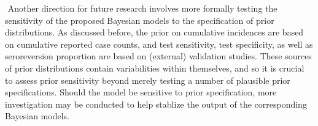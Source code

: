 \newline$ $
Another direction for future research involves more formally testing the sensitivity of the proposed Bayesian models to the specification of prior distributions. As discussed before, the prior on cumulative incidences are based on cumulative reported case counts, and test sensitivity, test specificity, as well as seroreversion proportion are based on (external) validation studies. These sources of prior distributions contain variabilities within themselves, and so it is crucial to assess prior sensitivity beyond merely testing a number of plausible prior specifications. Should the model be sensitive to prior specification, more investigation may be conducted to help stablize the output of the corresponding Bayesian models.
